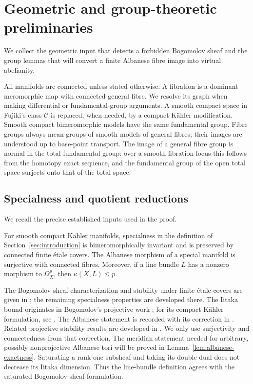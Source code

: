 \section{Geometric and group-theoretic preliminaries}\label{sec:preliminaries}

We collect the geometric input that detects a forbidden Bogomolov
sheaf and the group lemmas that will convert a finite Albanese fibre
image into virtual abelianity.

All manifolds are connected unless stated otherwise. A fibration is a
dominant meromorphic map with connected general fibre. We resolve its
graph when making differential or fundamental-group arguments. A smooth
compact space in Fujiki's class \(\mathcal C\) is replaced, when needed,
by a compact K\"ahler modification. Smooth compact bimeromorphic models
have the same fundamental group. Fibre groups always mean groups of
smooth models of general fibres; their images are understood up to
base-point transport. The image of a general fibre group is normal in
the total fundamental group: over a smooth fibration locus this follows
from the homotopy exact sequence, and the fundamental group of the open
total space surjects onto that of the total space.

\subsection{Specialness and quotient reductions}

We recall the precise established inputs used in the proof.

\begin{theorem}\label{thm:specialness-inputs}
For smooth compact K\"ahler manifolds, specialness in the definition of
Section~\ref{sec:introduction} is bimeromorphically invariant and is
preserved by connected finite \'etale covers. The Albanese morphism
of a special manifold is surjective with connected fibres. Moreover, if
a line bundle \(L\) has a nonzero morphism to \(\Omega_X^p\), then
\(\kappa(X,L)\le p\).
\end{theorem}

The Bogomolov-sheaf characterization and stability under finite
\'etale covers are given in
\cite[author's version, Theorems~2.26 and~5.12]{Campana2004};
the remaining specialness properties are developed there. The Iitaka
bound originates in Bogomolov's projective work \cite{Bogomolov1979};
for its compact K\"ahler formulation, see \cite{Campana2015Survey}.
The Albanese statement is recorded with its correction in
\cite[Theorem~1.2]{CampanaCorrection}. Related projective
stability results are developed in \cite{CampanaClaudon}. We only use
surjectivity and connectedness from that correction. The meridian
statement needed for arbitrary, possibly nonprojective Albanese tori
will be proved in Lemma~\ref{lem:albanese-exactness}.
Saturating a rank-one subsheaf and taking its double dual does not
decrease its Iitaka dimension. Thus the line-bundle definition agrees
with the saturated Bogomolov-sheaf formulation.

